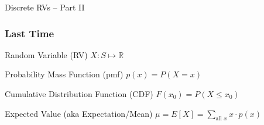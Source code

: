 \documentclass[handout]{beamer}
\date{Lecture \# 9}
\begin{document}
 


\begin{frame}[plain]
	\titlepage 
	

\end{frame} 


\begin{frame}
\centering \Huge Discrete RVs -- Part II

\end{frame}



\begin{frame}
\frametitle{Last Time}
\begin{block}{Random Variable (RV)}
$X\colon S \mapsto \mathbb{R}$
\end{block}
\begin{block}{Probability Mass Function (pmf)}
$p(x) = P(X = x)$
\end{block}
\begin{block}{Cumulative Distribution Function (CDF)}
$F(x_0) = P(X \leq x_0)$
\end{block}
\begin{block}{Expected Value (aka Expectation/Mean)}
$\mu = E[X] = \displaystyle\sum_{\mbox{all } x} x \cdot p(x)$
\end{block}
\end{frame}





	
\end{document}
